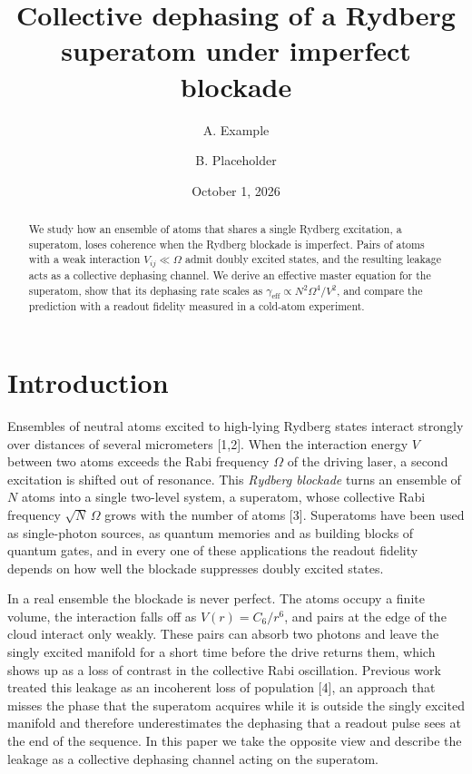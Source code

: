 \documentclass[aps,pra,twocolumn,superscriptaddress,10pt]{revtex4-2}
\begin{document}
\title{Collective dephasing of a Rydberg superatom under imperfect blockade}

\author{A. Example}
\author{B. Placeholder}

\date{October 1, 2026}

\begin{abstract}
We study how an ensemble of atoms that shares a single Rydberg excitation, a
superatom, loses coherence when the Rydberg blockade is imperfect. Pairs of
atoms with a weak interaction $V_{ij} \ll \Omega$ admit doubly excited states,
and the resulting leakage acts as a collective dephasing channel. We derive an
effective master equation for the superatom, show that its dephasing rate
scales as $\gamma_{\mathrm{eff}} \propto N^{2}\Omega^{4}/V^{2}$, and compare
the prediction with a readout fidelity measured in a cold-atom experiment.
\end{abstract}

\maketitle

\section{Introduction}

Ensembles of neutral atoms excited to high-lying Rydberg states interact
strongly over distances of several micrometers [1,2]. When the interaction
energy $V$ between two atoms exceeds the Rabi frequency $\Omega$ of the
driving laser, a second excitation is shifted out of resonance. This
\emph{Rydberg blockade} turns an ensemble of $N$ atoms into a single two-level
system, a superatom, whose collective Rabi frequency $\sqrt{N}\,\Omega$ grows
with the number of atoms [3]. Superatoms have been used as single-photon
sources, as quantum memories and as building blocks of quantum gates, and in
every one of these applications the readout fidelity depends on how well the
blockade suppresses doubly excited states.

In a real ensemble the blockade is never perfect. The atoms occupy a finite
volume, the interaction falls off as $V(r) = C_{6}/r^{6}$, and pairs at the
edge of the cloud interact only weakly. These pairs can absorb two photons
and leave the singly excited manifold for a short time before the drive
returns them, which shows up as a loss of contrast in the collective Rabi
oscillation. Previous work treated this leakage as an incoherent loss of
population [4], an approach that misses the phase that the superatom
acquires while it is outside the singly excited manifold and therefore
underestimates the dephasing that a readout pulse sees at the end of the
sequence. In this paper we take the opposite view and describe the leakage
as a collective dephasing channel acting on the superatom.
\end{document}
